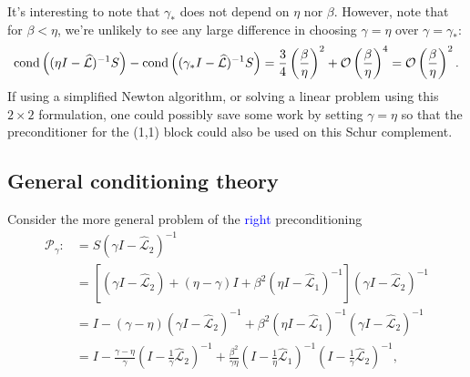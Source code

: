 \documentclass[a4paper,10pt]{article}
\newcommand{\tcb}{\textcolor{blue}}
\begin{document}
{It's interesting to note that $\gamma_*$ does not depend on $\eta$ nor $\beta$. However, note that for $\beta < \eta$, we're unlikely to see any large difference in choosing $\gamma = \eta$ over $\gamma = \gamma_*$:
\begin{align}
\textnormal{cond}\left((\eta I- \widehat{\mathcal{L}})^{-1}S\right)
-
\textnormal{cond}\left((\gamma_* I- \widehat{\mathcal{L}})^{-1}S\right)
=
\frac{3}{4} \left( \frac{\beta}{\eta} \right)^2 + {\cal O}\left( \frac{\beta}{\eta} \right)^4 = {\cal O} \left( \frac{\beta}{\eta} \right)^2.
\end{align}
If using a simplified Newton algorithm, or solving a linear problem using this $2 \times 2$ formulation, one could possibly save some work by setting $\gamma = \eta$ so that the preconditioner for the (1,1) block could also be used on this Schur complement.


\subsection{General conditioning theory}

Consider the more general problem of the \tcb{right} preconditioning 
%
\begin{align}\nonumber
\mathcal{P}_\gamma :&=
S(\gamma I- \widehat{\mathcal{L}}_2)^{-1} \\
& = \left[ (\gamma I - \widehat{\mathcal{L}}_2) + (\eta-\gamma)I +
	\beta^2 (\eta I - \widehat{\mathcal{L}}_1)^{-1}\right]
	(\gamma I - \widehat{\mathcal{L}}_2)^{-1} \\
& = I - (\gamma - \eta)( \gamma I- \widehat{\mathcal{L}}_2)^{-1} + 
	\beta^2( \eta I-\widehat{\mathcal{L}}_1)^{-1}
	( \gamma I- \widehat{\mathcal{L}}_2)^{-1}\nonumber\\
& = I - \frac{\gamma - \eta}{\gamma} ( I- \tfrac{1}{\gamma}\widehat{\mathcal{L}}_2)^{-1} + 
	\frac{\beta^2}{\gamma\eta}( I- \tfrac{1}{\eta}\widehat{\mathcal{L}}_1)^{-1}
	( I- \tfrac{1}{\gamma}\widehat{\mathcal{L}}_2)^{-1},\label{eq:gamma2}
\end{align}




}
\end{document}
